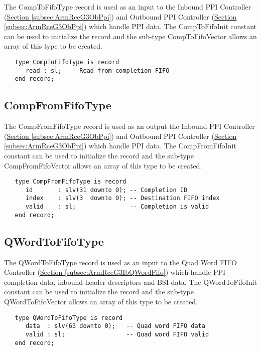 \documentclass[11pt]{article}
\begin{document}
The CompToFifoType record is used as an input to the Inbound PPI Controller (\hyperref[subsec:ArmRceG3ObPpi]{Section \ref*{subsec:ArmRceG3ObPpi}}) and Outbound PPI Controller (\hyperref[subsec:ArmRceG3ObPpi]{Section \ref*{subsec:ArmRceG3ObPpi}}) which handle PPI data. 
The CompToFifoInit constant can be used to initialize the record and the sub-type CompToFifoVector allows an array of this type to be created.

\small
\begin{verbatim}
   type CompToFifoType is record
      read : sl;  -- Read from completion FIFO
   end record;
\end{verbatim}
\normalsize

\subsection{CompFromFifoType}
\label{subsec:CompFromFifoType}

The CompFromFifoType record is used as an output the Inbound PPI Controller (\hyperref[subsec:ArmRceG3ObPpi]{Section \ref*{subsec:ArmRceG3ObPpi}}) and Outbound PPI Controller (\hyperref[subsec:ArmRceG3ObPpi]{Section \ref*{subsec:ArmRceG3ObPpi}}) which handle PPI data. 
The CompFromFifoInit constant can be used to initialize the record and the sub-type CompFromFifoVector allows an array of this type to be created.

\small
\begin{verbatim}
   type CompFromFifoType is record
      id       : slv(31 downto 0); -- Completion ID
      index    : slv(3  downto 0); -- Destination FIFO index
      valid    : sl;               -- Completion is valid
   end record;
\end{verbatim}
\normalsize

\subsection{QWordToFifoType}
\label{subsec:QWordToFifoType}

The QWordToFifoType record is used as an input to the Quad Word FIFO Controller (\hyperref[subsec:ArmRceG3IbQWordFifo]{Section \ref*{subsec:ArmRceG3IbQWordFifo}}) which handle PPI completion data, inbound header descriptors and BSI data.
The QWordToFifoInit constant can be used to initialize the record and the sub-type QWordToFifoVector allows an array of this type to be created.

\small
\begin{verbatim}
   type QWordToFifoType is record
      data  : slv(63 downto 0);   -- Quad word FIFO data
      valid : sl;                 -- Quad word FIFO valid
   end record;
\end{verbatim}
\normalsize
\end{document}
